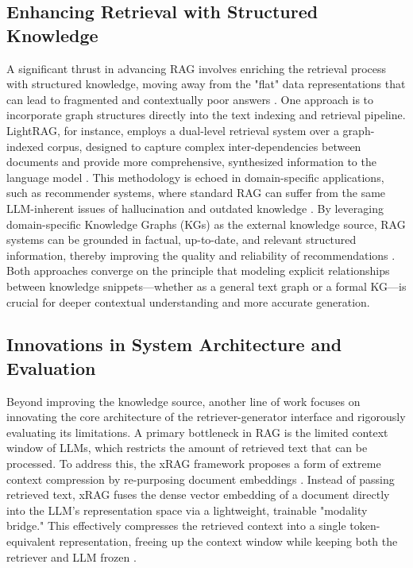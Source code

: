 \documentclass[11pt]{article}
\begin{document}
\subsection*{Enhancing Retrieval with Structured Knowledge}

A significant thrust in advancing RAG involves enriching the retrieval process with structured knowledge, moving away from the "flat" data representations that can lead to fragmented and contextually poor answers \cite{ref8}. One approach is to incorporate graph structures directly into the text indexing and retrieval pipeline. LightRAG, for instance, employs a dual-level retrieval system over a graph-indexed corpus, designed to capture complex inter-dependencies between documents and provide more comprehensive, synthesized information to the language model \cite{ref8}. This methodology is echoed in domain-specific applications, such as recommender systems, where standard RAG can suffer from the same LLM-inherent issues of hallucination and outdated knowledge \cite{ref9}. By leveraging domain-specific Knowledge Graphs (KGs) as the external knowledge source, RAG systems can be grounded in factual, up-to-date, and relevant structured information, thereby improving the quality and reliability of recommendations \cite{ref9}. Both approaches converge on the principle that modeling explicit relationships between knowledge snippets—whether as a general text graph or a formal KG—is crucial for deeper contextual understanding and more accurate generation.

\subsection*{Innovations in System Architecture and Evaluation}

Beyond improving the knowledge source, another line of work focuses on innovating the core architecture of the retriever-generator interface and rigorously evaluating its limitations. A primary bottleneck in RAG is the limited context window of LLMs, which restricts the amount of retrieved text that can be processed. To address this, the xRAG framework proposes a form of extreme context compression by re-purposing document embeddings \cite{ref4}. Instead of passing retrieved text, xRAG fuses the dense vector embedding of a document directly into the LLM's representation space via a lightweight, trainable "modality bridge." This effectively compresses the retrieved context into a single token-equivalent representation, freeing up the context window while keeping both the retriever and LLM frozen \cite{ref4}.
\end{document}
